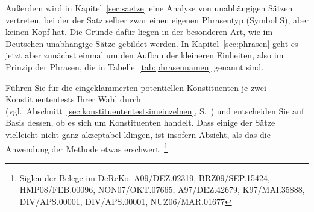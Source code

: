 
Außerdem wird in Kapitel~\ref{sec:saetze} eine Analyse von unabhängigen Sätzen vertreten, bei der der Satz selber zwar einen eigenen Phrasentyp (\zB Symbol S), aber keinen Kopf hat.
Die Gründe dafür liegen in der besonderen Art, wie im Deutschen unabhängige Sätze gebildet werden.
In Kapitel~\ref{sec:phrasen} geht es jetzt aber zunächst einmal um den Aufbau der kleineren Einheiten, also im Prinzip der Phrasen, die in Tabelle~\ref{tab:phrasennamen} genannt sind.






\Uebungen

\Uebung \label{u101} Führen Sie für die eingeklammerten potentiellen Konstituenten je zwei Konstituententests Ihrer Wahl durch (vgl.\ Abschnitt~\ref{sec:konstituententestsimeinzelnen}, S.~\pageref{sec:konstituententestsimeinzelnen}) und entscheiden Sie auf Basis dessen, ob es sich um Konstituenten handelt.
Dass einige der Sätze vielleicht nicht ganz akzeptabel klingen, ist insofern Absicht, als das die Anwendung der Methode etwas erschwert.%
\footnote{Siglen der Belege im DeReKo: A09\slash DEZ.02319, BRZ09\slash SEP.15424, HMP08\slash FEB.00096, NON07\slash OKT.07665, A97\slash DEZ.42679, K97\slash MAI.35888, DIV\slash APS.00001, DIV\slash APS.00001, NUZ06\slash MAR.01677}

